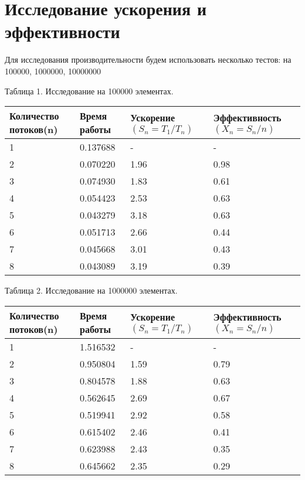 \documentclass[pdf, unicode, 12pt, a4paper,oneside,fleqn]{article}
\begin{document}
\pagebreak

\section{Исследование ускорения и эффективности}

Для исследования производительности будем использовать несколько тестов:
на 100000, 1000000, 10000000

Таблица 1. Исследование на 100000 элементах.

\begin{tabular}{|p{35mm}|p{35mm}|p{35mm}|p{35mm}|}
    \hline
    {Количество \newline потоков(n)} &Время работы&{Ускорение \newline $(S_n=T_1/T_n)$}&Эффективность $(X_n=S_n/n)$\\
    \hline
    1&0.137688&-&-\\
    \hline
    2&0.070220&1.96&0.98\\
    \hline
    3&0.074930&1.83&0.61\\
    \hline
    4&0.054423&2.53&0.63\\
    \hline
    5&0.043279&3.18&0.63\\
    \hline
    6&0.051713&2.66&0.44\\
    \hline
    7&0.045668&3.01&0.43\\
    \hline
    8&0.043089&3.19&0.39\\
    \hline
\end{tabular}

Таблица 2. Исследование на 1000000 элементах.

\begin{tabular}{|p{35mm}|p{35mm}|p{35mm}|p{35mm}|}
    \hline
    {Количество \newline потоков(n)} &Время работы&{Ускорение \newline $(S_n=T_1/T_n)$}&Эффективность $(X_n=S_n/n)$\\
    \hline
    1&1.516532&-&-\\
    \hline
    2&0.950804&1.59&0.79\\
    \hline
    3&0.804578&1.88&0.63\\
    \hline
    4&0.562645&2.69&0.67\\
    \hline
    5&0.519941&2.92&0.58\\
    \hline
    6&0.615402&2.46&0.41\\
    \hline
    7&0.623988&2.43&0.35\\
    \hline
    8&0.645662&2.35&0.29\\
    \hline
\end{tabular}
\end{document}
